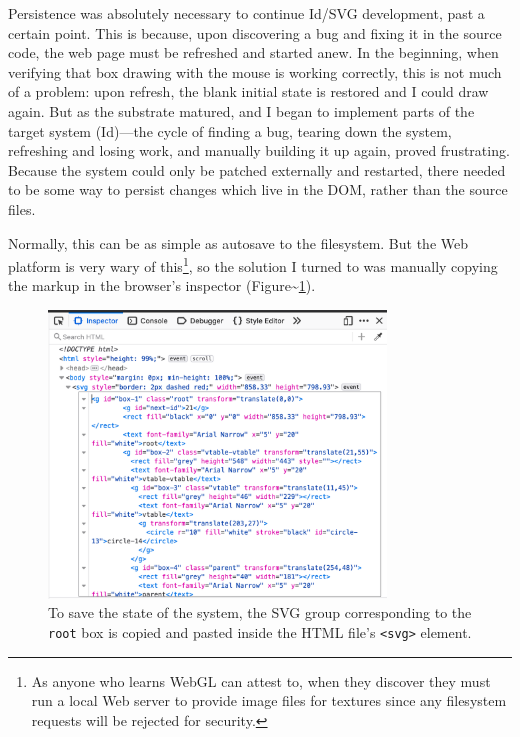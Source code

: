 Persistence was absolutely necessary to continue Id{}/SVG development,
past a certain point. This is because, upon discovering a bug and fixing
it in the source code, the web page must be refreshed and started anew.
In the beginning, when verifying that box drawing with the mouse is
working correctly, this is not much of a problem: upon refresh, the
blank initial state is restored and I could draw again. But as the
substrate matured, and I began to implement parts of the target system
(Id{})---the cycle of finding a bug, tearing down the system, refreshing
and losing work, and manually building it up again, proved frustrating.
Because the system could only be patched externally and restarted, there
needed to be some way to persist changes which live in the DOM, rather
than the source files.

Normally, this can be as simple as autosave to the filesystem. But the
Web platform is very wary of this\footnote{As anyone who learns WebGL
  can attest to, when they discover they must run a local Web server to
  provide image files for textures since any filesystem requests will be
  rejected for security.}, so the solution I turned to was manually
copying the markup in the browser's inspector
(Figure\textasciitilde{}\ref{fig:html-inspector}).

\begin{figure}[h]
  \centering
  \includegraphics[width=0.8\textwidth]{../html-inspector.png}
  \caption{To save the state of the system, the SVG group corresponding to the \texttt{root} box is copied and pasted inside the HTML file's \texttt{\textless{}svg\textgreater{}} element.\label{fig:html-inspector}}
\end{figure}


